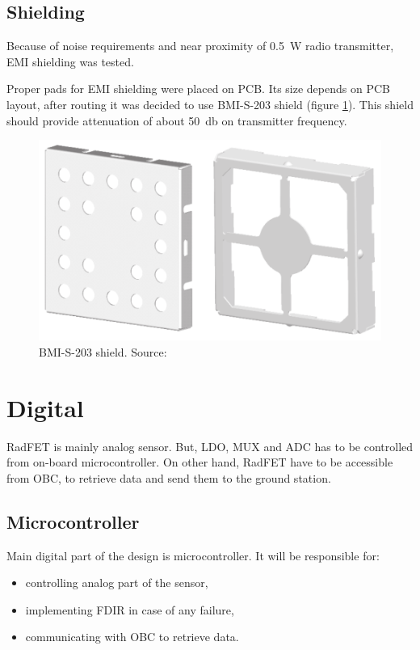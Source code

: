     \subsection{Shielding}
        Because of noise requirements and near proximity of \SI{0.5}{\watt} radio transmitter, EMI shielding was tested.

        Proper pads for EMI shielding were placed on PCB. Its size depends on PCB layout, after routing it was decided to use BMI-S-203 shield (figure \ref{BMI-S-203}). This shield should provide attenuation of about \SI{50}{\decibel} on transmitter frequency.

        \begin{figure}[H]
            \centering
            \includegraphics[width=0.7\paperwidth]{img/06/BMI-S-203.eps}
            \caption{BMI-S-203 shield. Source: \cite{EMI_shieldings_catalog}}
            \label{BMI-S-203}
        \end{figure}


\section{Digital}
    RadFET is mainly analog sensor. But, LDO, MUX and ADC has to be controlled from on-board microcontroller. On other hand, RadFET have to be accessible from OBC, to retrieve data and send them to the ground station.

    \subsection{Microcontroller}
        Main digital part of the design is microcontroller. It will be responsible for:
        \begin{itemize}
            \item controlling analog part of the sensor,
            \item implementing FDIR in case of any failure,
            \item communicating with OBC to retrieve data.
        \end{itemize}

